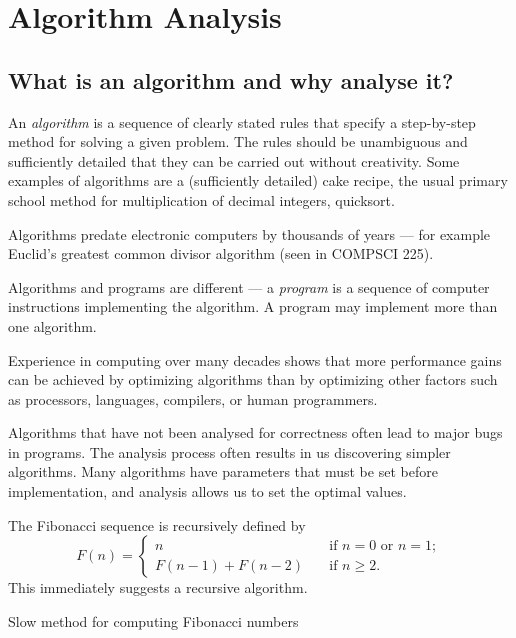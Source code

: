 \part{Algorithm Analysis} \label{ch:alganal}


\chapter{What is an algorithm and why analyse it?} %

An \emph{algorithm} is a sequence of clearly stated rules that
specify a step-by-step method for solving a given problem.
The rules should be unambiguous and
sufficiently detailed that they can be carried out without creativity.
Some examples of algorithms are a (sufficiently detailed) cake recipe,
the usual primary school method for multiplication of decimal integers, quicksort.

Algorithms predate electronic computers by thousands of years --- for example
Euclid's greatest common divisor algorithm (seen in COMPSCI 225).

Algorithms and programs are different --- a \emph{program} is a sequence of computer instructions implementing 
the algorithm. A program may implement more than one algorithm.

Experience in computing over many decades shows that more performance gains can be achieved 
by optimizing algorithms than by optimizing other factors such as
processors, languages, compilers, or human programmers.

Algorithms that have not been analysed for correctness often lead to 
major bugs in programs. The analysis process often results in us discovering simpler algorithms.
Many algorithms have parameters that must be set before implementation, and analysis allows us to set the optimal values.


\begin{Boxample}
The Fibonacci sequence is recursively defined by 
$$
F(n) = 
  \left\{\begin{array}{ll}
	n & \quad \text{if } n = 0 \text{ or } n = 1; \\ 
    F(n - 1) + F(n - 2) & \quad \text{if } n \geq 2 \text{.}
  \end{array}
  \right.
$$
This immediately suggests a recursive algorithm.
\end{Boxample}

\begin{algorithm}[H]
  \caption{Slow method for computing Fibonacci numbers} 
  \label{alg:slowfib}
\begin{algorithmic}[1]
\EndIf
\EndFunction
\end{algorithmic}
\end{algorithm}

